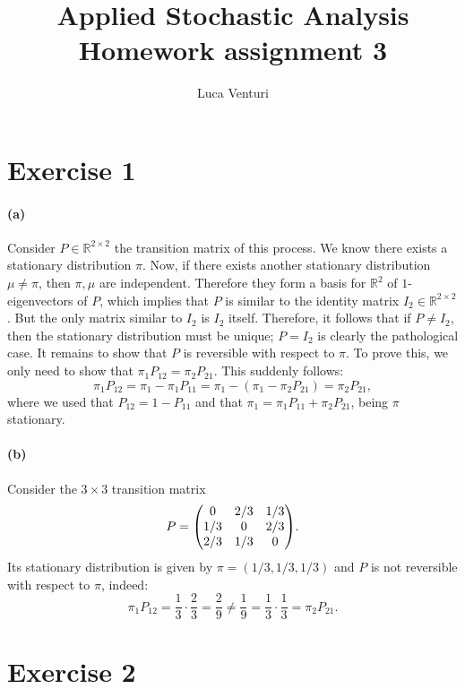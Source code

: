 \documentclass[a4paper,11pt]{article}
\theoremstyle{definition}
\theoremstyle{plain}
\theoremstyle{remark}
\DeclarePairedDelimiter{\parr}{(}{)}
\begin{document}
\title{Applied Stochastic Analysis \\ Homework assignment 3}
\author{Luca Venturi}
\maketitle

\section*{Exercise 1}

\paragraph*{(a)} Consider $P\in\mathbb{R}^{2\times 2}$ the transition matrix of this process. We know there exists a stationary distribution $\pi$. Now, if there exists another stationary distribution $\mu\neq\pi$, then $\pi,\mu$ are independent. Therefore they form a basis for $\mathbb{R}^2$ of $1$-eigenvectors of $P$, which implies that $P$ is similar to the identity matrix $I_2\in\mathbb{R}^{2\times 2}$. But the only matrix similar to $I_2$ is $I_2$ itself.
Therefore, it follows that if $P\neq I_2$, then  the stationary distribution must be unique; $P=I_2$ is clearly the pathological case. It remains to show that $P$ is reversible with respect to $\pi$. To prove this, we only need to show that
$\pi_1P_{12}=\pi_2P_{21}$. This suddenly follows:
$$
\pi_1P_{12}= \pi_1 - \pi_1P_{11} = \pi_1 - (\pi_1-\pi_2P_{21}) =\pi_2P_{21},   
$$ 
where we used that $P_{12}= 1-P_{11}$ and that $\pi_1=\pi_1P_{11}+\pi_2P_{21}$, being $\pi$ stationary.

\paragraph*{(b)} Consider the $3\times 3$ transition matrix
$$
P = \parr*{\begin{matrix}
0 & 2/3 & 1/3 \\ 1/3 & 0 & 2/3 \\ 2/3 & 1/3 & 0
\end{matrix}}.
$$
Its stationary distribution is given by $\pi=(1/3,1/3,1/3)$ and $P$ is not reversible with respect to $\pi$, indeed:
$$
\pi_1P_{12} = \frac{1}{3}\cdot\frac{2}{3} = \frac{2}{9} \neq  \frac{1}{9} = \frac{1}{3}\cdot\frac{1}{3} = \pi_2P_{21}.  
$$

\section*{Exercise 2}
\end{document}
